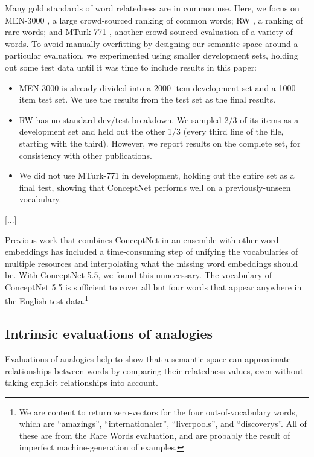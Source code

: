 \documentclass[letterpaper]{article}
\begin{document}
Many gold standards of word relatedness are in common use. Here, we focus on
MEN-3000 \cite{bruni2014men}, a large crowd-sourced ranking of common words; RW
\cite{luong2013rw}, a ranking of rare words; and MTurk-771
\cite{halawi2012mturk}, another crowd-sourced evaluation of a variety of words.
To avoid manually overfitting by designing our semantic space around a
particular evaluation, we experimented using smaller development sets, holding
out some test data until it was time to include results in this paper:

\begin{itemize}
\item
    MEN-3000 is already divided into a 2000-item development set and a
    1000-item test set. We use the results from the test set as the final results.
\item
    RW has no standard dev/test breakdown. We sampled 2/3 of its items as
    a development set and held out the other 1/3 (every third line of the file,
    starting with the third). However, we report results on the complete set,
    for consistency with other publications.
\item
    We did not use MTurk-771 in development, holding out the entire set
    as a final test, showing that ConceptNet performs well on a
    previously-unseen vocabulary.
\end{itemize}


[...]

Previous work that combines ConceptNet in an ensemble with other word
embeddings \cite{speer2016ensemble} has included a time-consuming step of
unifying the vocabularies of multiple resources and interpolating what the
missing word embeddings should be. With ConceptNet 5.5, we found this
unnecessary.  The vocabulary of ConceptNet 5.5 is sufficient to cover all but
four words that appear anywhere in the English test data.\footnote{We are
content to return zero-vectors for the four out-of-vocabulary words, which are
``amazings'', ``internationaler'', ``liverpools'', and ``discoverys''. All of
these are from the Rare Words evaluation, and are probably the result of
imperfect machine-generation of examples.}

\subsection{Intrinsic evaluations of analogies}

Evaluations of analogies help to show that a semantic space can approximate
relationships between words by comparing their relatedness values, even without
taking explicit relationships into account.
\end{document}
